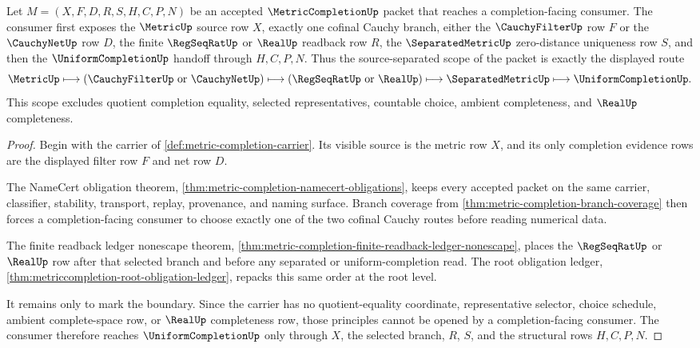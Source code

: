 \begin{theorem}
\label{thm:metriccompletion-source-separated-scope}
Let $M=(X,F,D,R,S,H,C,P,N)$ be an accepted $\MetricCompletionUp$ packet that reaches a completion-facing consumer. The consumer first exposes the $\MetricUp$ source row $X$, exactly one cofinal Cauchy branch, either the $\CauchyFilterUp$ row $F$ or the $\CauchyNetUp$ row $D$, the finite $\RegSeqRatUp$ or $\RealUp$ readback row $R$, the $\SeparatedMetricUp$ zero-distance uniqueness row $S$, and then the $\UniformCompletionUp$ handoff through $H,C,P,N$. Thus the source-separated scope of the packet is exactly the displayed route
$$
\MetricUp\longmapsto(\CauchyFilterUp\ \text{or}\ \CauchyNetUp)\longmapsto(\RegSeqRatUp\ \text{or}\ \RealUp)\longmapsto\SeparatedMetricUp\longmapsto\UniformCompletionUp .
$$
This scope excludes quotient completion equality, selected representatives, countable choice, ambient completeness, and $\RealUp$ completeness.
\end{theorem}
\begin{proof}
Begin with the carrier of \autoref{def:metric-completion-carrier}. Its visible source is the metric row $X$, and its only completion evidence rows are the displayed filter row $F$ and net row $D$.

The NameCert obligation theorem, \autoref{thm:metric-completion-namecert-obligations}, keeps every accepted packet on the same carrier, classifier, stability, transport, replay, provenance, and naming surface. Branch coverage from \autoref{thm:metric-completion-branch-coverage} then forces a completion-facing consumer to choose exactly one of the two cofinal Cauchy routes before reading numerical data.

The finite readback ledger nonescape theorem, \autoref{thm:metric-completion-finite-readback-ledger-nonescape}, places the $\RegSeqRatUp$ or $\RealUp$ row after that selected branch and before any separated or uniform-completion read. The root obligation ledger, \autoref{thm:metriccompletion-root-obligation-ledger}, repacks this same order at the root level.

It remains only to mark the boundary. Since the carrier has no quotient-equality coordinate, representative selector, choice schedule, ambient complete-space row, or $\RealUp$ completeness row, those principles cannot be opened by a completion-facing consumer. The consumer therefore reaches $\UniformCompletionUp$ only through $X$, the selected branch, $R$, $S$, and the structural rows $H,C,P,N$.
\end{proof}

